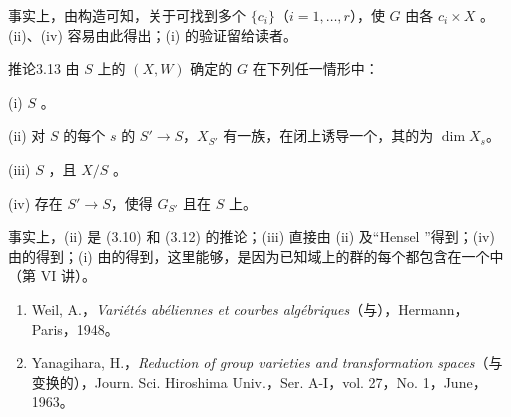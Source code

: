 事实上，由构造可知，关于可找到多个 $\{c_i\}$（$i=1,\ldots,r$），使 $G$ 由各 $c_i\times X$ 。(ii)、(iv) 容易由此得出；(i) 的验证留给读者。
\begin{SGAresult}{推论}{3.13}
由 $S$ 上的 $(X,W)$ 确定的 $G$ 在下列任一情形中：

(i) $S$ 。

(ii) 对 $S$ 的每个 $s$ 的 $S'\to S$，$X_{S'}$ 有一族，在闭上诱导一个，其的为 $\dim X_s$。

(iii) $S$ ，且 $X/S$ 。

(iv) 存在 $S'\to S$，使得 $G_{S'}$ 且在 $S$ 上。
\end{SGAresult}
事实上，(ii) 是 (3.10) 和 (3.12) 的推论；(iii) 直接由 (ii) 及“Hensel ”得到；(iv) 由的得到；(i) 由的得到，这里能够，是因为已知域上的群的每个都包含在一个中（第 VI 讲）。

\begin{enumerate}
\item[{[1]}] Weil, A.，\textit{Variétés abéliennes et courbes algébriques}（与），Hermann，Paris，1948。
\item[{[2]}] Yanagihara, H.，\textit{Reduction of group varieties and transformation spaces}（与变换的），Journ. Sci. Hiroshima Univ.，Ser. A-I，vol. 27，No. 1，June，1963。
\end{enumerate}
